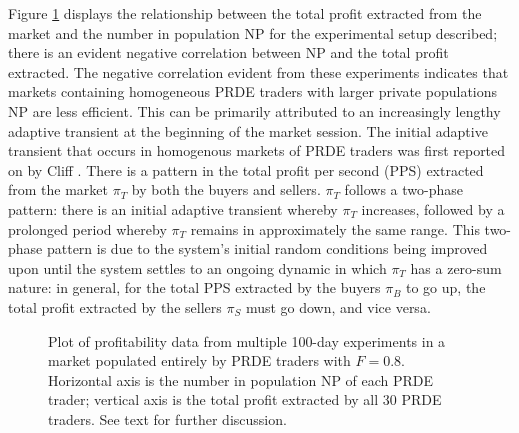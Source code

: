 \documentclass[conference]{IEEEtran}
\begin{document}
Figure \ref{NP_profit} displays the relationship between the total profit extracted from the market and the number in population $\mathrm{NP}$ for the experimental setup described; there is an evident negative correlation between $\mathrm{NP}$ and the total profit extracted.
The negative correlation evident from these experiments indicates that markets containing homogeneous PRDE traders with larger private populations $\mathrm{NP}$ are less efficient.
This can be primarily attributed to an increasingly lengthy adaptive transient at the beginning of the market session.
The initial adaptive transient that occurs in homogenous markets of PRDE traders was first reported on by Cliff \cite{PRDE}.
There is a pattern in the total profit per second (PPS) extracted from the market $\pi_T$ by both the buyers and sellers.
$\pi_T$ follows a two-phase pattern: there is an initial adaptive transient whereby $\pi_T$ increases, followed by a prolonged period whereby $\pi_T$ remains in approximately the same range.
This two-phase pattern is due to the system's initial random conditions being improved upon until the system settles to an ongoing dynamic in which $\pi_T$ has a zero-sum nature: in general, for the total PPS extracted by the buyers $\pi_B$ to go up, the total profit extracted by the sellers $\pi_S$ must go down, and vice versa.

\begin{figure}[htbp]
    \centering
    \caption{
        Plot of profitability data from multiple 100-day experiments in a market populated entirely by PRDE traders with $F=0.8$.
        Horizontal axis is the number in population $\mathrm{NP}$ of each PRDE trader; vertical axis is the total profit extracted by all 30 PRDE traders.
        See text for further discussion.
    }
    \label{NP_profit}
\end{figure}
\end{document}
